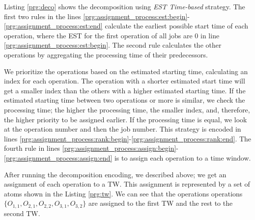 \documentclass{tlp} %
\begin{document}

Listing \ref{prg:deco} shows the decomposition using \emph{EST Time-based} strategy. The first two rules in the lines \ref{prg:assignment_process:est:begin}-\ref{prg:assignment_process:est:end} calculate the earliest possible start time of each operation, where the EST for the first operation of all jobs are $0$ in line \ref{prg:assignment_process:est:begin}. The second rule calculates the other operations by aggregating the processing time of their predecessors. 

We prioritize the operations based on the estimated starting time, calculating an index for each operation. The operation with a shorter estimated start time will get a smaller index than the others with a higher estimated starting time. If the estimated starting time between two operations or more is similar, we check the processing time; the higher the processing time, the smaller index, and, therefore, the higher priority to be assigned earlier. If the processing time is equal, we look at the operation number and then the job number. This strategy is encoded in lines \ref{prg:assignment_process:rank:begin}-\ref{prg:assignment_process:rank:end}. The fourth rule in lines \ref{prg:assignment_process:assign:begin}-\ref{prg:assignment_process:assign:end} is to assign each operation to a time window.



After running the decomposition encoding, we described above; we get an assignment of each operation to a TW. This assignment is represented by a set of atoms shown in the Listing \ref{prg:tw}. We can see that the operations operations $\{ O_{1,1}, O_{2,1}, O_{2,2}, O_{3,1}, O_{3,2} \}$ are assigned to the first TW and the rest to the second TW.


\end{document}

